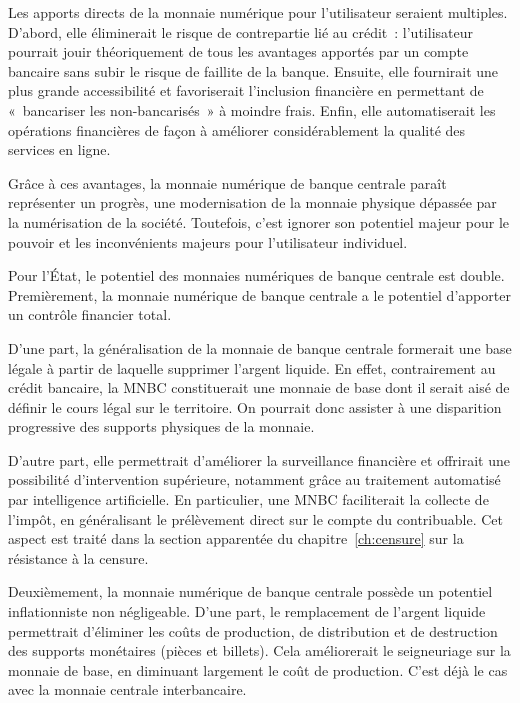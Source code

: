 Les apports directs de la monnaie numérique pour l'utilisateur seraient multiples. D'abord, elle éliminerait le risque de contrepartie lié au crédit~: l'utilisateur pourrait jouir théoriquement de tous les avantages apportés par un compte bancaire sans subir le risque de faillite de la banque. Ensuite, elle fournirait une plus grande accessibilité et favoriserait l'inclusion financière en permettant de «~bancariser les non-bancarisés~» à moindre frais. Enfin, elle automatiserait les opérations financières de façon à améliorer considérablement la qualité des services en ligne.

Grâce à ces avantages, la monnaie numérique de banque centrale paraît représenter un progrès, une modernisation de la monnaie physique dépassée par la numérisation de la société. Toutefois, c'est ignorer son potentiel majeur pour le pouvoir et les inconvénients majeurs pour l'utilisateur individuel.


Pour l'État, le potentiel des monnaies numériques de banque centrale est double. Premièrement, la monnaie numérique de banque centrale a le potentiel d'apporter un contrôle financier total.

D'une part, la généralisation de la monnaie de banque centrale formerait une base légale à partir de laquelle supprimer l'argent liquide. En effet, contrairement au crédit bancaire, la MNBC constituerait une monnaie de base dont il serait aisé de définir le cours légal sur le territoire. On pourrait donc assister à une disparition progressive des supports physiques de la monnaie.

D'autre part, elle permettrait d'améliorer la surveillance financière et offrirait une possibilité d'intervention supérieure, notamment grâce au traitement automatisé par intelligence artificielle. En particulier, une MNBC faciliterait la collecte de l'impôt, en généralisant le prélèvement direct sur le compte du contribuable. Cet aspect est traité dans la section apparentée du chapitre~\ref{ch:censure} sur la résistance à la censure.


Deuxièmement, la monnaie numérique de banque centrale possède un potentiel inflationniste non négligeable. D'une part, le remplacement de l'argent liquide permettrait d'éliminer les coûts de production, de distribution et de destruction des supports monétaires (pièces et billets). Cela améliorerait le seigneuriage sur la monnaie de base, en diminuant largement le coût de production. C'est déjà le cas avec la monnaie centrale interbancaire.

